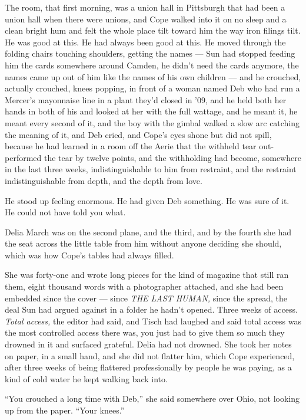 \documentclass[11pt,openany]{book}
\newcommand{\scenebreak}{\par\vspace{0.5\baselineskip}\begin{center}\textasteriskcentered\quad\textasteriskcentered\quad\textasteriskcentered\end{center}\vspace{0.5\baselineskip}\par}
\begin{document}
The room, that first morning, was a union hall in Pittsburgh that had been a union hall when there were unions, and Cope walked into it on no sleep and a clean bright hum and felt the whole place tilt toward him the way iron filings tilt. He was good at this. He had always been good at this. He moved through the folding chairs touching shoulders, getting the names --- Sun had stopped feeding him the cards somewhere around Camden, he didn't need the cards anymore, the names came up out of him like the names of his own children --- and he crouched, actually crouched, knees popping, in front of a woman named Deb who had run a Mercer's mayonnaise line in a plant they'd closed in '09, and he held both her hands in both of his and looked at her with the full wattage, and he meant it, he meant every second of it, and the boy with the gimbal walked a slow arc catching the meaning of it, and Deb cried, and Cope's eyes shone but did not spill, because he had learned in a room off the Aerie that the withheld tear out-performed the tear by twelve points, and the withholding had become, somewhere in the last three weeks, indistinguishable to him from restraint, and the restraint indistinguishable from depth, and the depth from love.

He stood up feeling enormous. He had given Deb something. He was sure of it. He could not have told you what.


\scenebreak


Delia March was on the second plane, and the third, and by the fourth she had the seat across the little table from him without anyone deciding she should, which was how Cope's tables had always filled.

She was forty-one and wrote long pieces for the kind of magazine that still ran them, eight thousand words with a photographer attached, and she had been embedded since the cover --- since \textit{THE LAST HUMAN,} since the spread, the deal Sun had argued against in a folder he hadn't opened. Three weeks of access. \textit{Total access,} the editor had said, and Tisch had laughed and said total access was the most controlled access there was, you just had to give them so much they drowned in it and surfaced grateful. Delia had not drowned. She took her notes on paper, in a small hand, and she did not flatter him, which Cope experienced, after three weeks of being flattered professionally by people he was paying, as a kind of cold water he kept walking back into.

``You crouched a long time with Deb,'' she said somewhere over Ohio, not looking up from the paper. ``Your knees.''
\end{document}
